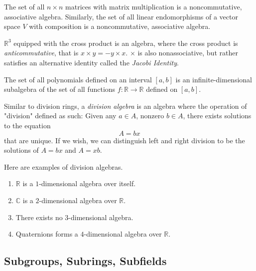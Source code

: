 \documentclass{article}
\begin{document}
\begin{example}
  The set of all $n \times n$ matrices with matrix multiplication is a noncommutative, associative algebra. Similarly, the set of all linear endomorphisms of a vector space $V$ with composition is a noncommutative, associative algebra. 
\end{example}

\begin{example}
  $\mathbb{R}^3$ equipped with the cross product is an algebra, where the cross product is \textit{anticommutative}, that is $x \times y = - y \times x$. $\times$ is also nonassociative, but rather satisfies an alternative identity called the \textit{Jacobi Identity}. 
\end{example}

\begin{example}
  The set of all polynomials defined on an interval $[a,b]$ is an infinite-dimensional subalgebra of the set of all functions $f: \mathbb{R} \longrightarrow \mathbb{R}$ defined on $[a,b]$.
\end{example}

\begin{definition}
  Similar to division rings, a \textit{division algebra} is an algebra where the operation of "division" defined as such: Given any $a \in A$, nonzero $b \in A$, there exists solutions to the equation
  \begin{equation}
    A = bx
  \end{equation}
  that are unique. If we wish, we can distinguish left and right division to be the solutions of $A = b x$ and $A = x b$. 
\end{definition}

\begin{definition}
  Here are examples of division algebras.
  \begin{enumerate}
    \item $\mathbb{R}$ is a $1$-dimensional algebra over itself. 
    \item $\mathbb{C}$ is a $2$-dimensional algebra over $\mathbb{R}$. 
    \item There exists no $3$-dimensional algebra. 
    \item Quaternions forms a $4$-dimensional algebra over $\mathbb{R}$. 
  \end{enumerate}
\end{definition}

\subsection{Subgroups, Subrings, Subfields}
\end{document}
